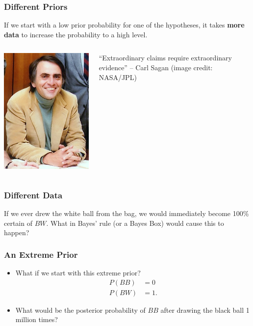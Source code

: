 \documentclass{beamer}
\begin{document}
\begin{frame}
\frametitle{Different Priors}
If we start with a low prior probability for one of the hypotheses, it takes
{\bf more data} to increase the probability to a high level.



    \begin{columns} %
        \hspace{2em}
        \includegraphics[width=0.6\linewidth]{images/sagan.jpg}

        ``Extraordinary claims require extraordinary evidence'' --
        Carl Sagan (image credit: NASA/JPL)
     \end{columns}


\end{frame}

\begin{frame}
\frametitle{Different Data}
If we ever drew the white ball from the bag, we would immediately become
100\% certain of $BW$. What in Bayes' rule (or a Bayes Box) would cause this
to happen?

\end{frame}


\begin{frame}
\frametitle{An Extreme Prior}
\begin{itemize}
\item What if we start with this extreme prior?
\begin{align}
P(BB) &= 0 \\
P(BW) &= 1.
\end{align}

\item What would be the posterior probability of $BB$ after drawing the black
ball 1 million times?

\end{itemize}

\end{frame}
\end{document}
